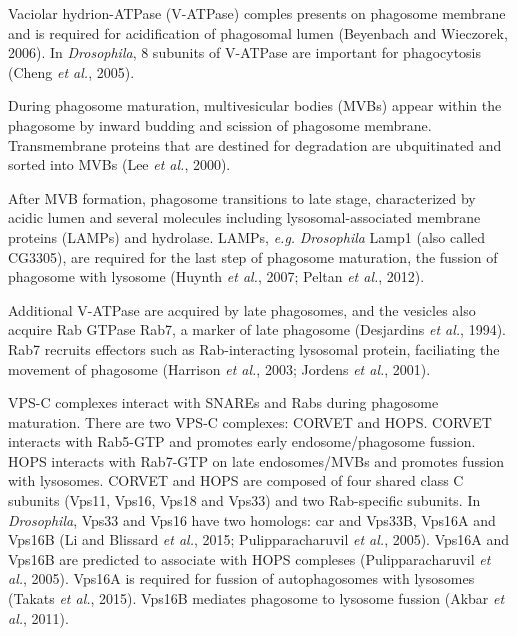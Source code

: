 \documentclass[11pt]{article}
\begin{document}
\newline

Vaciolar hydrion-ATPase (V-ATPase) comples presents on phagosome membrane and is required for acidification of phagosomal lumen (Beyenbach and Wieczorek, 2006). 
In \textit{Drosophila}, 8 subunits of V-ATPase are important for phagocytosis (Cheng \textit{et al.}, 2005).

\newline

During phagosome maturation, multivesicular bodies (MVBs) appear within the phagosome by inward budding and scission of phagosome membrane. 
Transmembrane proteins that are destined for degradation are ubquitinated and sorted into MVBs (Lee \textit{et al.}, 2000). 

\newline

After MVB formation, phagosome transitions to late stage, characterized by acidic lumen and several molecules including lysosomal-associated membrane proteins (LAMPs) and hydrolase. 
LAMPs, \textit{e.g.} \textit{Drosophila} Lamp1 (also called CG3305), are required for the last step of phagosome maturation, the fussion of phagosome with lysosome (Huynth \textit{et al.}, 2007; Peltan \textit{et al.}, 2012).

\newline

Additional V-ATPase are acquired by late phagosomes, and the vesicles also acquire Rab GTPase Rab7, a marker of late phagosome (Desjardins \textit{et al.}, 1994). 
Rab7 recruits effectors such as Rab-interacting lysosomal protein, faciliating the movement of phagosome (Harrison \textit{et al.}, 2003; Jordens \textit{et al.}, 2001). 

\newline

VPS-C complexes interact with SNAREs and Rabs during phagosome maturation. 
There are two VPS-C complexes: CORVET and HOPS. 
CORVET interacts with Rab5-GTP and promotes early endosome/phagosome fussion. 
HOPS interacts with Rab7-GTP on late endosomes/MVBs and promotes fussion with lysosomes. 
CORVET and HOPS are composed of four shared class C subunits (Vps11, Vps16, Vps18 and Vps33) and two Rab-specific subunits. 
In \textit{Drosophila}, Vps33 and Vps16 have two homologs: car and Vps33B, Vps16A and Vps16B (Li and Blissard \textit{et al.}, 2015; Pulipparacharuvil \textit{et al.}, 2005). 
Vps16A and Vps16B are predicted to associate with HOPS compleses (Pulipparacharuvil \textit{et al.}, 2005). 
Vps16A is required for fussion of autophagosomes with lysosomes (Takats \textit{et al.}, 2015). 
Vps16B mediates phagosome to lysosome fussion (Akbar \textit{et al.}, 2011).
\end{document}

